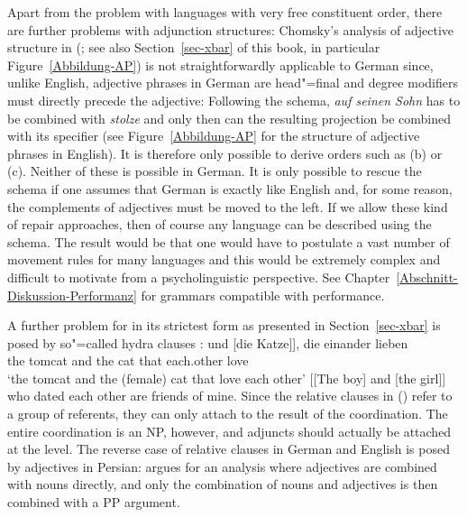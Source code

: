 Apart from the problem with languages with very free constituent order, there are further problems with adjunction structures: Chomsky's analysis of adjective structure
in \xbart (\citealp[]{Chomsky70a}; see also Section~\ref{sec-xbar} of this book, in
particular Figure~\vref{Abbildung-AP}) is not straightforwardly applicable to German since, unlike
English, adjective phrases in German are head"=final and degree modifiers must directly precede the
adjective: 
\eal
{}
\zl
Following the \xbar schema, \emph{auf seinen Sohn} has to be combined with \emph{stolze} and only then can the
resulting \abar projection be combined with its specifier (see Figure~\vref{Abbildung-AP} for the structure of adjective
phrases in English). It is therefore only possible to derive orders such as (b) or (c). Neither of these
is possible in German. It is only possible to rescue the \xbar schema if one assumes that German is
exactly like English and, for some reason, the complements of adjectives must be moved to the left. If we allow these kind of repair
approaches, then of course any language can be described using the \xbar schema. The result would be that one would have
to postulate a vast number of movement rules for many languages and this would be extremely complex and difficult
to motivate from a psycholinguistic perspective. See Chapter~\ref{Abschnitt-Diskussion-Performanz} for grammars compatible with performance.

A further problem for \xbart in its strictest form as presented in Section~\ref{sec-xbar} is posed by so"=called hydra clauses \citep{PR70a,Link84a-u,Kiss2005a}:
\eal
\ex {}
\gll [[der Kater] und [die Katze]], die einander lieben\\
     \spacebr{}\spacebr{}the tomcat and the cat that each.other love\\
\glt `the tomcat and the (female) cat that love each other'
\ex {}[[The boy] and [the girl]] who dated each other are friends of mine. 
\zl
Since the relative clauses in () refer to a group of referents, they can only attach to the result of the coordination.
The entire coordination is an NP, however, and adjuncts should actually be attached at the \xbar level. The reverse case of relative clauses
in German and English is posed by adjectives in Persian: \citet{Samvelian2007a} argues for an analysis where adjectives are combined with nouns
directly, and only the combination of nouns and adjectives is then combined with a PP argument.


